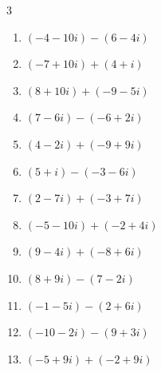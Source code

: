 \begin{multicols}{3}
\begin{enumerate}
\columnbreak %

  \item $\displaystyle (-4-10i) - (6-4i)$

        \phantom{$\displaystyle =-10-6i$}

  \item $\displaystyle (-7+10i) + (4+i)$

        \phantom{$\displaystyle =-3+11i$}

  \item $\displaystyle (8+10i) + (-9-5i)$

        \phantom{$\displaystyle =-1+5i$}

  \item $\displaystyle (7-6i) - (-6+2i)$

        \phantom{$\displaystyle =13-8i$}

  \item $\displaystyle (4-2i) + (-9+9i)$

        \phantom{$\displaystyle =-5+7i$}

  \item $\displaystyle (5+i) - (-3-6i)$

        \phantom{$\displaystyle =8+7i$}

  \item $\displaystyle (2-7i) + (-3+7i)$

        \phantom{$\displaystyle =-1$}

  \item $\displaystyle (-5-10i) + (-2+4i)$

        \phantom{$\displaystyle =-7-6i$}

  \item $\displaystyle (9-4i) + (-8+6i)$

        \phantom{$\displaystyle =1+2i$}

  \item $\displaystyle (8+9i) - (7-2i)$

        \phantom{$\displaystyle =1+11i$}

  \item $\displaystyle (-1-5i) - (2+6i)$

        \phantom{$\displaystyle =-3-11i$}

  \item $\displaystyle (-10-2i) - (9+3i)$

        \phantom{$\displaystyle =-19-5i$}

  \item $\displaystyle (-5+9i) + (-2+9i)$


\end{enumerate}
\end{multicols}
